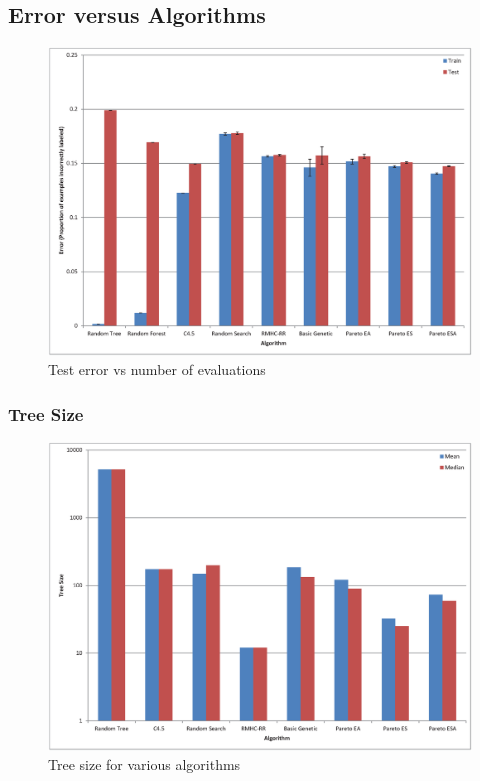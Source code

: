 \documentclass{acm_proc_article-sp}
\begin{document}
\subsection{Error versus Algorithms}

\begin{figure}[h]
\centering
\includegraphics[width=\linewidth]{error_comparison_chart.eps}
\caption{Test error vs number of evaluations}
\end{figure}

\subsubsection{Tree Size}

\begin{figure}[h]
\centering
\includegraphics[width=\linewidth]{size_chart.eps}
\caption{Tree size for various algorithms}
\end{figure}
\end{document}
